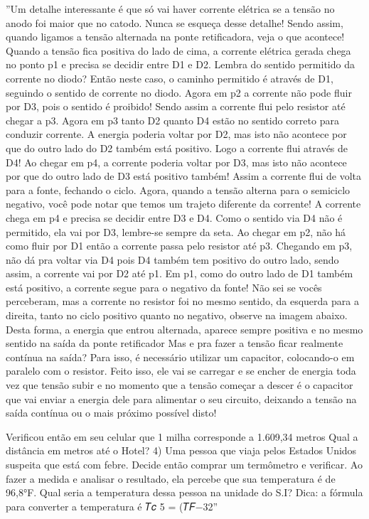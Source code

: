 \documentclass[a4paper,12pt]{article}
\begin{document}
''Um detalhe interessante é que só vai haver corrente elétrica se a tensão no anodo foi maior que no catodo. Nunca se esqueça desse detalhe! Sendo assim, quando ligamos a tensão alternada na ponte retificadora, veja o que acontece! Quando a tensão fica positiva do lado de cima, a corrente elétrica gerada chega no ponto p1 e precisa se decidir entre D1 e D2.
Lembra do sentido permitido da corrente no diodo? Então neste caso, o caminho permitido é através de D1, seguindo o sentido de corrente no diodo.
Agora em p2 a corrente não pode fluir por D3, pois o sentido é proibido! Sendo assim a corrente flui pelo resistor até chegar a p3.
Agora em p3 tanto D2 quanto D4 estão no sentido correto para conduzir corrente. A energia poderia voltar por D2, mas isto não acontece por que do outro lado do D2 também está positivo. Logo a corrente flui através de D4!
Ao chegar em p4, a corrente poderia voltar por D3, mas isto não acontece por que do outro lado de D3 está positivo também! Assim a corrente flui de volta para a fonte, fechando o ciclo.
Agora, quando a tensão alterna para o semiciclo negativo, você pode notar que temos um trajeto diferente da corrente! A corrente chega em p4 e precisa se decidir entre D3 e D4.
Como o sentido via D4 não é permitido, ela vai por D3, lembre-se sempre da seta.
Ao chegar em p2, não há como fluir por D1 então a corrente passa pelo resistor até p3.
Chegando em p3, não dá pra voltar via D4 pois D4 também tem positivo do outro lado, sendo assim, a corrente vai por D2 até p1.
Em p1, como do outro lado de D1 também está positivo, a corrente segue para o negativo da fonte!
Não sei se vocês perceberam, mas a corrente no resistor foi no mesmo sentido, da esquerda para a direita, tanto no ciclo positivo quanto no negativo, observe na imagem abaixo. Desta forma, a energia que entrou alternada, aparece sempre positiva e no mesmo sentido na saída da ponte retificador
Mas e pra fazer a tensão ficar realmente contínua na saída? Para isso, é necessário utilizar um capacitor, colocando-o em paralelo com o resistor. Feito isso, ele vai se carregar e se encher de energia toda vez que tensão subir e no momento que a tensão começar a descer é o capacitor que vai enviar a energia dele para alimentar o seu circuito, deixando a tensão na saída contínua ou o mais próximo possível disto!


Verificou então em seu celular que 1 milha corresponde a 1.609,34 metros
Qual a distância em metros até o Hotel?
4) Uma pessoa que viaja pelos Estados Unidos suspeita que está com febre. Decide então 
comprar um termômetro e verificar. Ao fazer a medida e analisar o resultado, ela 
percebe que sua temperatura é de 96,8°F.
Qual seria a temperatura dessa pessoa na unidade do S.I?
Dica: a fórmula para converter a temperatura é 𝑇𝑐
5
=
(𝑇𝐹−32''
\end{document}
